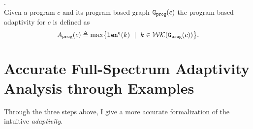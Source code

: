 %
%
\begin{defn}
.
\label{def:prog_adapt}
\\
{
Given a program ${c}$ and its program-based graph 
$\mathtt{{G_{prog}}}({c})$
%
the program-based adaptivity for $c$ is 
defined as%
\[
\progA({c})
\triangleq \max
\left\{ \qlen(k) \ \mid \  k \in \walks(\progG(c))\right \}.
\]
}
\end{defn}


\section{Accurate Full-Spectrum Adaptivity Analysis through Examples}
\label{sec:improved-examples}
Through the three steps above, I give a more accurate formalization of the intuitive \emph{adaptivity}.

